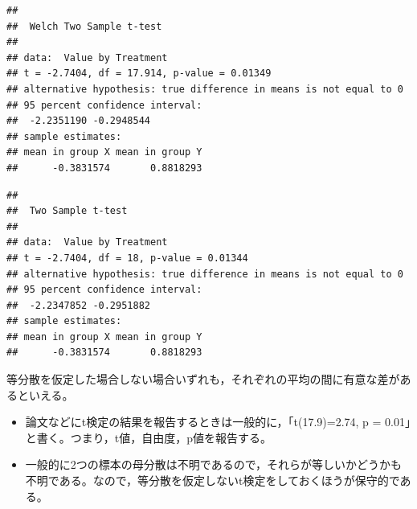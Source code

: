 \documentclass[]{article}
\newenvironment{Shaded}{\begin{snugshade}}{\end{snugshade}}
\newcommand{\KeywordTok}[1]{\textcolor[rgb]{0.13,0.29,0.53}{\textbf{#1}}}
\newcommand{\DataTypeTok}[1]{\textcolor[rgb]{0.13,0.29,0.53}{#1}}
\newcommand{\StringTok}[1]{\textcolor[rgb]{0.31,0.60,0.02}{#1}}
\newcommand{\CommentTok}[1]{\textcolor[rgb]{0.56,0.35,0.01}{\textit{#1}}}
\newcommand{\OperatorTok}[1]{\textcolor[rgb]{0.81,0.36,0.00}{\textbf{#1}}}
\newcommand{\NormalTok}[1]{#1}
\providecommand{\tightlist}{%
  \setlength{\itemsep}{0pt}\setlength{\parskip}{0pt}}
\begin{document}
\begin{Shaded}
\end{Shaded}

\begin{verbatim}
## 
##  Welch Two Sample t-test
## 
## data:  Value by Treatment
## t = -2.7404, df = 17.914, p-value = 0.01349
## alternative hypothesis: true difference in means is not equal to 0
## 95 percent confidence interval:
##  -2.2351190 -0.2948544
## sample estimates:
## mean in group X mean in group Y 
##      -0.3831574       0.8818293
\end{verbatim}

\begin{Shaded}
\end{Shaded}

\begin{verbatim}
## 
##  Two Sample t-test
## 
## data:  Value by Treatment
## t = -2.7404, df = 18, p-value = 0.01344
## alternative hypothesis: true difference in means is not equal to 0
## 95 percent confidence interval:
##  -2.2347852 -0.2951882
## sample estimates:
## mean in group X mean in group Y 
##      -0.3831574       0.8818293
\end{verbatim}

等分散を仮定した場合しない場合いずれも，それぞれの平均の間に有意な差があるといえる。

\begin{itemize}
\tightlist
\item
  論文などにt検定の結果を報告するときは一般的に，「t(17.9)=2.74, p =
  0.01」と書く。つまり，t値，自由度，p値を報告する。
\item
  一般的に2つの標本の母分散は不明であるので，それらが等しいかどうかも不明である。なので，等分散を仮定しないt検定をしておくほうが保守的である。
\end{itemize}
\end{document}
